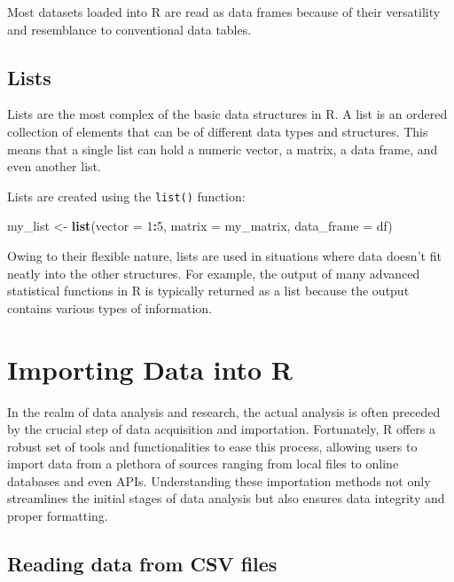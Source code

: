 \documentclass[
  b5paper]{book}
\newenvironment{Shaded}{\begin{snugshade}}{\end{snugshade}}
\newcommand{\AttributeTok}[1]{\textcolor[rgb]{0.13,0.29,0.53}{#1}}
\newcommand{\DecValTok}[1]{\textcolor[rgb]{0.00,0.00,0.81}{#1}}
\newcommand{\FunctionTok}[1]{\textcolor[rgb]{0.13,0.29,0.53}{\textbf{#1}}}
\newcommand{\NormalTok}[1]{#1}
\newcommand{\OtherTok}[1]{\textcolor[rgb]{0.56,0.35,0.01}{#1}}
\newcommand{\SpecialCharTok}[1]{\textcolor[rgb]{0.81,0.36,0.00}{\textbf{#1}}}
\begin{document}
Most datasets loaded into R are read as data frames because of their versatility and resemblance to conventional data tables.

\hypertarget{lists}{%
\subsection*{Lists}\label{lists}}

Lists are the most complex of the basic data structures in R. A list is an ordered collection of elements that can be of different data types and structures. This means that a single list can hold a numeric vector, a matrix, a data frame, and even another list.

Lists are created using the \texttt{list()} function:

\begin{Shaded}
\begin{Highlighting}[]
\NormalTok{my\_list }\OtherTok{\textless{}{-}} \FunctionTok{list}\NormalTok{(}\AttributeTok{vector =} \DecValTok{1}\SpecialCharTok{:}\DecValTok{5}\NormalTok{, }\AttributeTok{matrix =}\NormalTok{ my\_matrix, }\AttributeTok{data\_frame =}\NormalTok{ df)}
\end{Highlighting}
\end{Shaded}

Owing to their flexible nature, lists are used in situations where data doesn't fit neatly into the other structures. For example, the output of many advanced statistical functions in R is typically returned as a list because the output contains various types of information.

\hypertarget{importing-data-into-r}{%
\section{Importing Data into R}\label{importing-data-into-r}}

In the realm of data analysis and research, the actual analysis is often preceded by the crucial step of data acquisition and importation. Fortunately, R offers a robust set of tools and functionalities to ease this process, allowing users to import data from a plethora of sources ranging from local files to online databases and even APIs. Understanding these importation methods not only streamlines the initial stages of data analysis but also ensures data integrity and proper formatting.

\hypertarget{reading-data-from-csv-files}{%
\subsection*{Reading data from CSV files}\label{reading-data-from-csv-files}}
\end{document}
